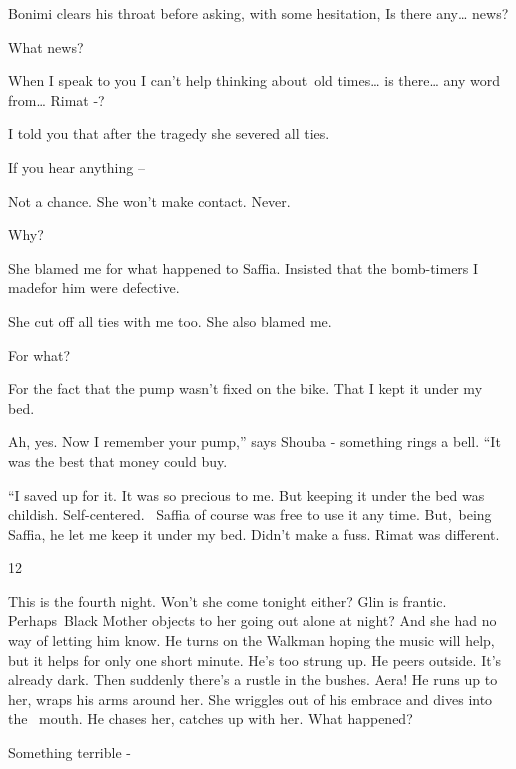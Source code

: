 \documentclass[letterpaper]{article}
\begin{document}
Bonimi clears his throat before asking, with some hesitation, {\textquotedbl} Is there any{\dots} news?{\textquotedbl} 

{\textquotedbl}What news?{\textquotedbl} 

{\textquotedbl}When I speak to you I can't help thinking about~old times{\dots} is there{\dots} any word from{\dots}
Rimat -?{\textquotedbl} 

{\textquotedbl}I told you that after the tragedy she severed all ties.{\textquotedbl} 

{\textquotedbl}If you hear anything --{\textquotedbl} 

{\textquotedbl}Not a chance. She won't make contact. Never.{\textquotedbl} 

{\textquotedbl}Why?{\textquotedbl} 

{\textquotedbl}She blamed me for what happened to Saffia. Insisted that the bomb-timers I madefor him were
defective.{\textquotedbl} 

{\textquotedbl}She cut off all ties with me too. She also blamed me.{\textquotedbl} 

{\textquotedbl}For what?{\textquotedbl}~ 

{\textquotedbl}For the fact that the pump wasn't fixed on the bike. That I kept it under my bed.{\textquotedbl} 

{\textquotedbl}Ah, yes. Now I remember your pump,'' says Shouba - something rings a bell. ``It was the best that money
could buy.{\textquotedbl}

{}``I saved up for it. It was so precious to me. But keeping it under the bed was childish. Self-centered. \ Saffia of
course was free to use it any time. But,~being Saffia, he let me keep it under my bed. Didn't make a fuss. Rimat was
different.{\textquotedbl} 


\bigskip

12~

This is the fourth night. Won't she come tonight either? Glin is frantic. Perhaps~Black Mother objects to her going out
alone at night? And she had no way of letting him know. He turns on the Walkman hoping the music will help, but it
helps for only one short minute. He's too strung up. He peers outside. It's already dark. Then suddenly there's a
rustle in the bushes. Aera! He runs up to her, wraps his arms around her. She wriggles out of his embrace and dives
into the \ mouth. He chases her, catches up with her. {\textquotedbl}What happened?{\textquotedbl} 

{\textquotedbl}Something terrible -{\textquotedbl} 
\end{document}
